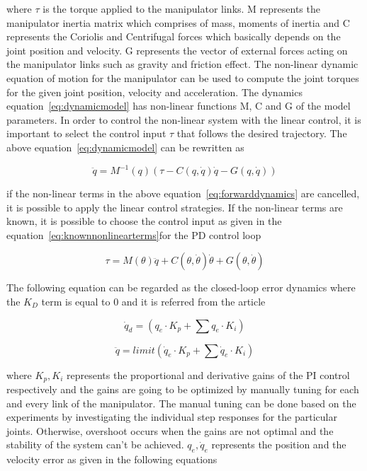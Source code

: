 where $\tau$ is the torque applied to the manipulator links. M represents the manipulator inertia matrix which comprises of mass, moments of inertia and C represents the Coriolis and Centrifugal forces which basically depends on the joint position and velocity. G represents the vector of external forces acting on the manipulator links such as gravity and friction effect. The non-linear dynamic equation of motion for the manipulator can be used to compute the joint torques for the given joint position, velocity and acceleration. The dynamics equation~\eqref{eq:dynamicmodel} has non-linear functions M, C and G of the model parameters. In order to control the non-linear system with the linear control, it is important to select the control input $\tau$ that follows the desired trajectory. The above equation~\eqref{eq:dynamicmodel} can be rewritten as 

\begin{equation}
\ddot{q} = M^{-1}(q) (\tau - C(q, \dot{q})\dot{q} - G(q, \dot{q}))
\label{eq:forwarddynamics}
\end{equation}

if the non-linear terms in the above equation~\eqref{eq:forwarddynamics} are cancelled, it is possible to apply the linear control strategies. If the non-linear terms are known, it is possible to choose the control input as given in the equation~\eqref{eq:knownnonlinearterms}for the PD control loop 

\begin{equation}
\tau = M(\theta) \ddot{q} + C(\theta, \dot{\theta})\dot{\theta} + G(\theta, \dot{\theta})
\label{eq:knownnonlinearterms}
\end{equation}

The following equation can be regarded as the closed-loop error dynamics where the $K_D$ term is equal to 0 and it is referred from the article~\cite{Chung2016}

\begin{equation}
\dot{q}_d = (q_e\cdot K_p + \sum q_e\cdot K_i)
\end{equation}

\begin{equation}
\ddot{q} = limit(\dot{q}_e\cdot K_p + \sum \dot{q}_e\cdot K_i)
\end{equation}

where $K_p, K_i$ represents the proportional and derivative gains of the PI control respectively and the gains are going to be optimized by manually tuning for each and every link of the manipulator. The manual tuning can be done based on the experiments by investigating the individual step responses for the particular joints. Otherwise, overshoot occurs when the gains are not optimal and the stability of the system can’t be achieved. $q_e, \dot{q}_e$ represents the position and the velocity error as given in the following equations

